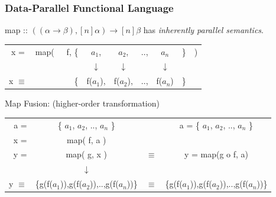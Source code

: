 \documentclass{beamer}
\renewcommand{\emph}[1]{\textcolor{structure}{#1}}
\newcommand{\emp}[1]{\textcolor{DikuRed}{ #1}}
\begin{document}
\begin{frame}[fragile,t]
   \frametitle{Data-Parallel Functional Language}

\emp{map} :: $((\alpha \rightarrow \beta), [n]\alpha) \rightarrow [n]\beta $ has \emph{\em inherently parallel semantics}.

\bigskip

\begin{tabular}{crcccccl}
x = & \emp{map}(~~~f, \{& $a_1$, & $a_2$, & .., & $a_n$ & \} & )\\
    &      & $\downarrow$ & $\downarrow$ &  & $\downarrow$ & &\\
x $\equiv$ &  \{  & \emph{f($a_1$)}, & \emph{f($a_2$)}, & .., & \emph{f($a_n$)} & \} &
\end{tabular}

\bigskip
\bigskip
\pause

\emp{Map Fusion:} (higher-order transformation)

\begin{tabular}{rccc}
a = & \{ $a_1$, $a_2$, .., $a_n$ \} & & a = \{ $a_1$, $a_2$, .., $a_n$ \} \\  
\emp{x =} & \emp{map( f, a )} & & \\
\emph{y} = & \emp{map( g, x )} & $\equiv$ & \emph{y} = \emp{map(g o f, a)}\\
  & $\downarrow$ & & \\
\emph{y} $\equiv$ &  \{\emph{g(f($a_1$))},\emph{g(f($a_2$))},..,\emph{g(f($a_n$))}\} & $\equiv$ & \{\emph{g(f($a_1$))},\emph{g(f($a_2$))},..,\emph{g(f($a_n$))}\} \\
\end{tabular}

\end{frame}
\end{document}
